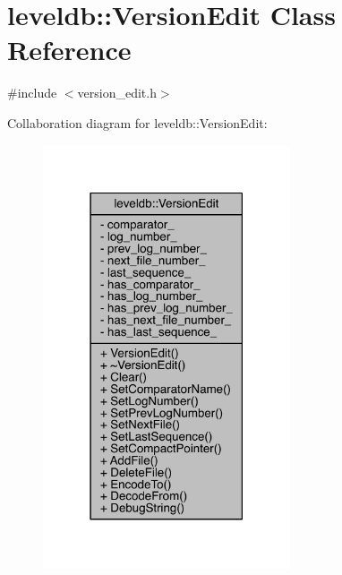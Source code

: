 \hypertarget{classleveldb_1_1_version_edit}{}\section{leveldb\+:\+:Version\+Edit Class Reference}
\label{classleveldb_1_1_version_edit}


{\ttfamily \#include $<$version\+\_\+edit.\+h$>$}



Collaboration diagram for leveldb\+:\+:Version\+Edit\+:\nopagebreak
\begin{figure}[H]
\begin{center}
\leavevmode
\includegraphics[width=207pt]{classleveldb_1_1_version_edit__coll__graph}
\end{center}
\end{figure}
